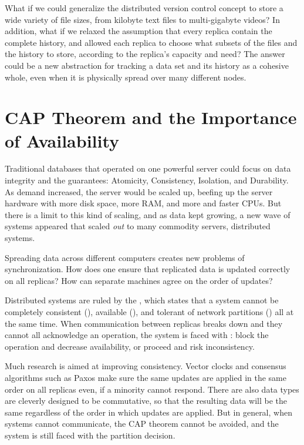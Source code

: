 What if we could generalize the distributed version control concept to store a
wide variety of file sizes, from kilobyte text files to multi-gigabyte videos?
In addition, what if we relaxed the assumption that every replica contain the
complete history, and allowed each replica to choose what subsets of the files
and the history to store, according to the replica's capacity and need? The
answer could be a new abstraction for tracking a data set and its history as a
cohesive whole, even when it is physically spread over many different nodes.

%



\section{CAP Theorem and the Importance of Availability}

Traditional databases that operated on one powerful server could focus on data
integrity and the  guarantees: Atomicity, Consistency, Isolation,
and Durability. As demand increased, the server would be scaled up, beefing up
the server hardware with more disk space, more RAM, and more and faster CPUs.
But there is a limit to this kind of scaling, and as data kept growing, a new
wave of systems appeared that scaled \emph{out} to many commodity servers,
distributed systems.

Spreading data across different computers creates new problems of
synchronization. How does one ensure that replicated data is updated correctly
on all replicas? How can separate machines agree on the order of updates?

Distributed systems are ruled by the  \cite{cap_origin},
which states that a system cannot be completely consistent (),
available (), and tolerant of network partitions () all at
the same time. When communication between replicas breaks down and they cannot
all acknowledge an operation, the system is faced with : block the operation and decrease availability, or proceed and risk
inconsistency\cite{cap_years_later}.

Much research is aimed at improving consistency. Vector
clocks\cite{lamport_ordering} and consensus algorithms such as
Paxos\cite{paxos_made_simple,paxos_made_moderately_complex} make sure the same
updates are applied in the same order on all replicas even, if a minority cannot
respond. There are also data types are cleverly designed to be commutative, so
that the resulting data will be the same regardless of the order in which
updates are applied\cite{crdt_orig}. But in general, when systems cannot
communicate, the CAP theorem cannot be avoided\cite{cap_proof}, and the system
is still faced with the partition decision.

